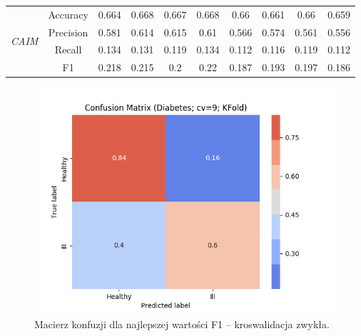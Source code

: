 \begin{table}[H]
\begin{tabular}{|c|c|c|c|c|c|c|c|c|c|}
                                            \multirow{4}{*}{\textit{CAIM}}  & Accuracy & 0.664 & 0.668 & 0.667 & 0.668 & 0.66 & 0.661 & 0.66 & 0.659 \\ \cline{2-10}
                                             & Precision & 0.581 & 0.614 & 0.615 & 0.61 & 0.566 & 0.574 & 0.561 & 0.556 \\ \cline{2-10}
                                             & Recall & 0.134 & 0.131 & 0.119 & 0.134 & 0.112 & 0.116 & 0.119 & 0.112 \\ \cline{2-10}
                                             & F1 & 0.218 & 0.215 & 0.2 & 0.22 & 0.187 & 0.193 & 0.197 & 0.186 \\ \hline  \hline
            \hline
        \end{tabular}
    \end{table}

\begin{figure}[H]
    \includegraphics[width=\textwidth]{img/conf_matrices/cm_Diabetes_cv9_KFold.png}
    \caption{Macierz konfuzji dla najlepszej wartości F1 -- kroswalidacja zwykła.}
\end{figure}